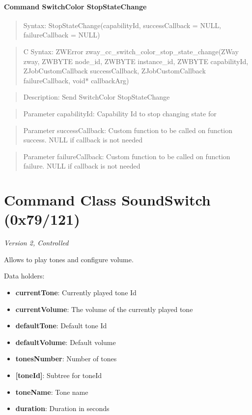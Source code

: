 \paragraph{Command SwitchColor StopStateChange}
\begin{quote}Syntax: StopStateChange(capabilityId, successCallback = NULL, failureCallback = NULL)\end{quote}
\begin{quote}C Syntax: ZWError zway\_cc\_switch\_color\_stop\_state\_change(ZWay zway, ZWBYTE node\_id, ZWBYTE instance\_id, ZWBYTE capabilityId, ZJobCustomCallback successCallback, ZJobCustomCallback failureCallback, void* callbackArg)\end{quote}
\begin{quote}Description: Send SwitchColor StopStateChange\end{quote}
\begin{quote}Parameter capabilityId: Capability Id to stop changing state for\end{quote}
\begin{quote}Parameter successCallback: Custom function to be called on function success. NULL if callback is not needed\end{quote}
\begin{quote}Parameter failureCallback: Custom function to be called on function failure. NULL if callback is not needed\end{quote}



\section{Command Class SoundSwitch (0x79/121)}

\textit{Version 2, Controlled}
\newline

Allows to play tones and configure volume.
\newline

\noindent
Data holders:

\begin{itemize}
\item \textbf{currentTone}: Currently played tone Id
\item \textbf{currentVolume}: The volume of the currently played tone
\item \textbf{defaultTone}: Default tone Id
\item \textbf{defaultVolume}: Default volume
\item \textbf{tonesNumber}: Number of tones
\item \textbf{[toneId]}: Subtree for toneId
\item \qquad\textbf{toneName}: Tone name
\item \qquad\textbf{duration}: Duration in seconds
\end{itemize}

